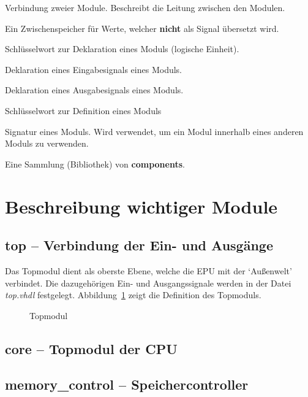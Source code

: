 \begin{description}[align=right, labelwidth=1.6cm]
\item[signal]		Verbindung zweier Module. Beschreibt die Leitung zwischen den
					Modulen.
\item[variable]		Ein Zwischenspeicher für Werte, welcher \textbf{nicht} als
					Signal übersetzt wird.
\item[entity]		Schlüsselwort zur Deklaration eines Moduls (logische Einheit).
\item[in]			Deklaration eines Eingabesignals eines Moduls.
\item[out]			Deklaration eines Ausgabesignals eines Moduls.
\item[architecture]	Schlüsselwort zur Definition eines Moduls
\item[component]	Signatur eines Moduls. Wird verwendet, um ein Modul
					innerhalb eines anderen Moduls zu verwenden.
\item[package]		Eine Sammlung (Bibliothek) von \textbf{components}.
\end{description}
\pagebreak
\section{Beschreibung wichtiger Module}
\subsection{top -- Verbindung der Ein- und Ausgänge}
Das Topmodul dient als oberste Ebene, welche die \ac{EPU} mit der `Außenwelt'
verbindet. Die dazugehörigen Ein- und Ausgangssignale werden in der Datei
\textit{top.vhdl} festgelegt. Abbildung~\ref{code:top} zeigt die Definition des
Topmoduls.
\begin{figure}[htb]

\caption{Topmodul}
\label{code:top}
\end{figure}
\subsection{core -- Topmodul der CPU}
\pagebreak
\subsection{memory\_control -- Speichercontroller}
\pagebreak
